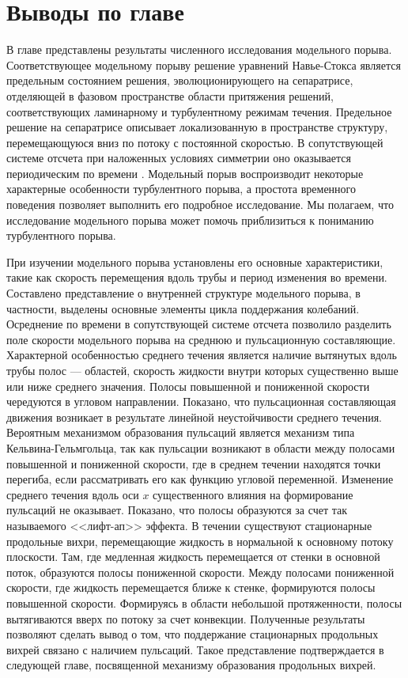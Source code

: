 \section{Выводы по главе}

В главе представлены результаты численного исследования модельного порыва. Соответствующее модельному порыву решение уравнений Навье-Стокса является предельным состоянием решения, эволюционирующего на сепаратрисе, отделяющей в фазовом пространстве области притяжения решений, соответствующих ламинарному и турбулентному режимам течения. Предельное решение на сепаратрисе описывает локализованную в пространстве структуру, перемещающуюся вниз по потоку с постоянной скоростью. В сопутствующей системе отсчета при наложенных условиях симметрии оно оказывается периодическим по времени \cite{Avila2013}. Модельный порыв воспроизводит некоторые характерные особенности турбулентного порыва, а простота временного поведения позволяет выполнить его подробное исследование. Мы полагаем, что исследование модельного порыва может помочь приблизиться к пониманию турбулентного порыва.

При изучении модельного порыва установлены его основные характеристики, такие как скорость перемещения вдоль трубы и период изменения во времени. Составлено представление о внутренней структуре модельного порыва, в частности, выделены основные элементы цикла поддержания колебаний. Осреднение по времени в сопутствующей системе отсчета позволило разделить поле скорости модельного порыва на среднюю и пульсационную составляющие. Характерной особенностью среднего течения является наличие вытянутых вдоль трубы полос --- областей, скорость жидкости внутри которых существенно выше или ниже среднего значения. Полосы повышенной и пониженной скорости чередуются в угловом направлении. Показано, что пульсационная составляющая движения возникает в результате линейной неустойчивости среднего течения. Вероятным механизмом образования пульсаций является механизм типа Кельвина-Гельмгольца, так как пульсации возникают в области между полосами повышенной и пониженной скорости, где в среднем течении находятся точки перегиба, если рассматривать его как функцию угловой переменной. Изменение среднего течения вдоль оси $x$ существенного влияния на формирование пульсаций не оказывает. Показано, что полосы образуются за счет так называемого <<лифт-ап>> эффекта. В течении существуют стационарные продольные вихри, перемещающие жидкость в нормальной к основному потоку плоскости. Там, где медленная жидкость перемещается от стенки в основной поток, образуются полосы пониженной скорости. Между полосами пониженной скорости, где жидкость перемещается ближе к стенке, формируются полосы повышенной скорости. Формируясь в области небольшой протяженности, полосы вытягиваются вверх по потоку за счет конвекции. Полученные результаты позволяют сделать вывод о том, что поддержание стационарных продольных вихрей связано с наличием пульсаций. Такое представление подтверждается в следующей главе, посвященной механизму образования продольных вихрей.

